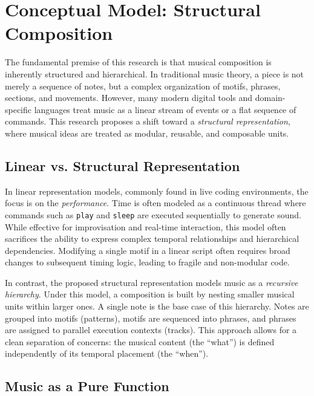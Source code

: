 \section{Conceptual Model: Structural Composition}\label{sec:conceptual-model}

The fundamental premise of this research is that musical composition is inherently structured and hierarchical.
In traditional music theory, a piece is not merely a sequence of notes, but a complex organization of motifs, phrases,
sections, and movements.
However, many modern digital tools and domain-specific languages treat music as a linear stream of events or a flat
sequence of commands.
This research proposes a shift toward a \textit{structural representation}, where musical ideas are treated as modular,
reusable, and composable units.

\subsection{Linear vs. Structural Representation}\label{detail-subsec:linear-vs.-structural-representation}

In linear representation models, commonly found in live coding environments, the focus is on the \textit{performance}.
Time is often modeled as a continuous thread where commands such as \texttt{play} and \texttt{sleep} are executed
sequentially to generate sound.
While effective for improvisation and real-time interaction, this model often sacrifices the ability to express complex
temporal relationships and hierarchical dependencies.
Modifying a single motif in a linear script often requires broad changes to subsequent timing logic, leading to fragile
and non-modular code.

In contrast, the proposed structural representation models music as a \textit{recursive hierarchy}.
Under this model, a composition is built by nesting smaller musical units within larger ones.
A single note is the base case of this hierarchy.
Notes are grouped into motifs (patterns), motifs are sequenced into phrases, and phrases are assigned to parallel
execution contexts (tracks).
This approach allows for a clean separation of concerns: the musical content (the ``what'') is defined independently of
its temporal placement (the ``when'').

\subsection{Music as a Pure Function}\label{detail-subsec:music-as-a-pure-function}

